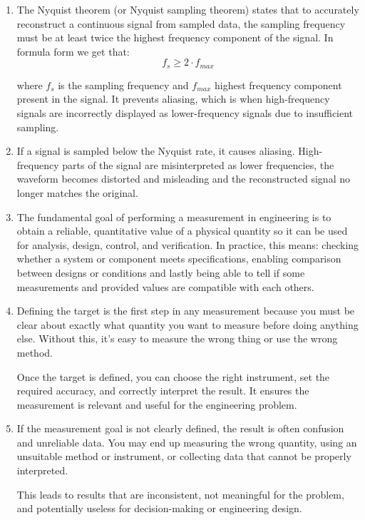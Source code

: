 \documentclass[../main.tex]{subfiles}
\begin{document}
\begin{enumerate}[label=\textbf{\arabic*.}]
	
	\item The Nyquist theorem (or Nyquist sampling theorem) states that to accurately reconstruct a continuous signal from sampled data, the sampling frequency must be at least twice the highest frequency component of the signal. In formula form we get that:
	\begin{equation}
		f_s \geq 2 \cdot f_{max}
	\end{equation}
	
	where $f_s$ is the sampling frequency and $f_{max}$ highest frequency component present in the signal. It prevents aliasing, which is when high-frequency signals are incorrectly displayed as lower-frequency signals due to insufficient sampling.

	

	\item If a signal is sampled below the Nyquist rate, it causes aliasing. High-frequency parts of the signal are misinterpreted as lower frequencies, the waveform becomes distorted and misleading and the reconstructed signal no longer matches the original.
	
	
	\item The fundamental goal of performing a measurement in engineering is to obtain a reliable, quantitative value of a physical quantity so it can be used for analysis, design, control, and verification. In practice, this means: checking whether a system or component meets specifications, enabling comparison between designs or conditions and lastly being able to tell if some measurements and provided values are compatible with each others.  
	
	
	\item Defining the target is the first step in any measurement because you must be clear about exactly what quantity you want to measure before doing anything else. Without this, it’s easy to measure the wrong thing or use the wrong method.

	Once the target is defined, you can choose the right instrument, set the required accuracy, and correctly interpret the result. It ensures the measurement is relevant and useful for the engineering problem.

	\item If the measurement goal is not clearly defined, the result is often confusion and unreliable data. You may end up measuring the wrong quantity, using an unsuitable method or instrument, or collecting data that cannot be properly interpreted.

	This leads to results that are inconsistent, not meaningful for the problem, and potentially useless for decision-making or engineering design.
	

\end{enumerate}
\end{document}
